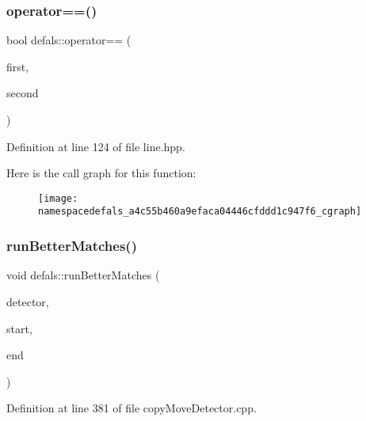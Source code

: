 \subsubsection{\texorpdfstring{operator==()}{operator==()}\hspace{0.1cm}{\footnotesize\ttfamily [2/2]}}
{\footnotesize\ttfamily bool defals\+::operator== (\begin{DoxyParamCaption}\item[{const \hyperlink{classdefals_1_1_line}{Line} \&}]{first,  }\item[{const \hyperlink{classdefals_1_1_line}{Line} \&}]{second }\end{DoxyParamCaption})\hspace{0.3cm}{\ttfamily [inline]}}



Definition at line 124 of file line.\+hpp.

Here is the call graph for this function\+:\nopagebreak
\begin{figure}[H]
\begin{center}
\leavevmode
\texttt{[image: namespacedefals\_a4c55b460a9efaca04446cfddd1c947f6\_cgraph]}
\end{center}
\end{figure}
\mbox{\label{namespacedefals_aec8e056bd901239f1b5fe64dd0a1645f}} 
\subsubsection{\texorpdfstring{run\+Better\+Matches()}{runBetterMatches()}}
{\footnotesize\ttfamily void defals\+::run\+Better\+Matches (\begin{DoxyParamCaption}\item[{\hyperlink{classdefals_1_1copy_move_detector}{copy\+Move\+Detector} \&}]{detector,  }\item[{int}]{start,  }\item[{int}]{end }\end{DoxyParamCaption})}



Definition at line 381 of file copy\+Move\+Detector.\+cpp.

